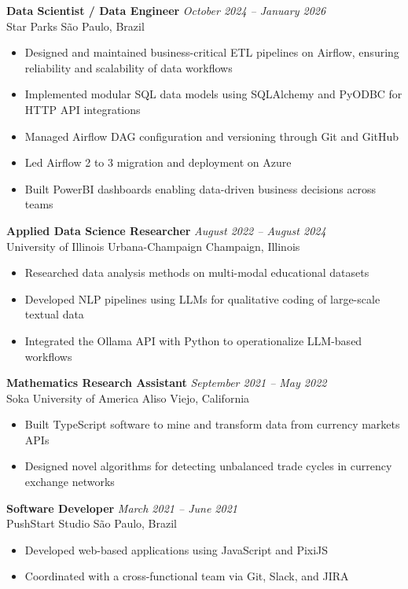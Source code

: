 \documentclass[11pt, a4paper]{article}
\begin{document}
\vspace{4pt}
\textbf{Data Scientist / Data Engineer} \hfill \textit{October 2024 -- January 2026}\\
Star Parks \hfill São Paulo, Brazil
\begin{itemize}
    \item Designed and maintained business-critical ETL pipelines on Airflow, ensuring reliability and scalability of data workflows
    \item Implemented modular SQL data models using SQLAlchemy and PyODBC for HTTP API integrations
    \item Managed Airflow DAG configuration and versioning through Git and GitHub
    \item Led Airflow 2 to 3 migration and deployment on Azure
    \item Built PowerBI dashboards enabling data-driven business decisions across teams
\end{itemize}

\vspace{4pt}
\textbf{Applied Data Science Researcher} \hfill \textit{August 2022 -- August 2024}\\
University of Illinois Urbana-Champaign \hfill Champaign, Illinois
\begin{itemize}
    \item Researched data analysis methods on multi-modal educational datasets
    \item Developed NLP pipelines using LLMs for qualitative coding of large-scale textual data
    \item Integrated the Ollama API with Python to operationalize LLM-based workflows
\end{itemize}

\vspace{4pt}
\textbf{Mathematics Research Assistant} \hfill \textit{September 2021 -- May 2022}\\
Soka University of America \hfill Aliso Viejo, California
\begin{itemize}
    \item Built TypeScript software to mine and transform data from currency markets APIs
    \item Designed novel algorithms for detecting unbalanced trade cycles in currency exchange networks
\end{itemize}

\vspace{4pt}
\textbf{Software Developer} \hfill \textit{March 2021 -- June 2021}\\
PushStart Studio \hfill São Paulo, Brazil
\begin{itemize}
    \item Developed web-based applications using JavaScript and PixiJS
    \item Coordinated with a cross-functional team via Git, Slack, and JIRA
\end{itemize}
\end{document}

